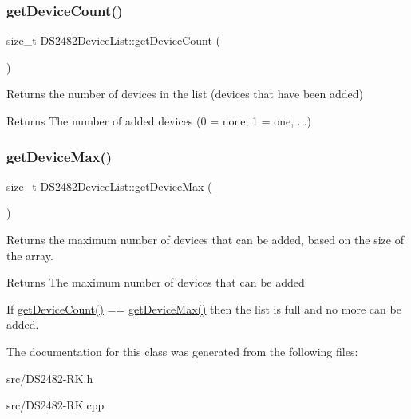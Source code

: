 \subsubsection{\texorpdfstring{get\+Device\+Count()}{getDeviceCount()}}
{\footnotesize\ttfamily size\+\_\+t D\+S2482\+Device\+List\+::get\+Device\+Count (\begin{DoxyParamCaption}{ }\end{DoxyParamCaption})\hspace{0.3cm}{\ttfamily [inline]}}



Returns the number of devices in the list (devices that have been added) 

\begin{DoxyReturn}{Returns}
The number of added devices (0 = none, 1 = one, ...) 
\end{DoxyReturn}
\mbox{\label{class_d_s2482_device_list_a20680f2eeb04a5db9f0e82d8ceff872e}} 
\subsubsection{\texorpdfstring{get\+Device\+Max()}{getDeviceMax()}}
{\footnotesize\ttfamily size\+\_\+t D\+S2482\+Device\+List\+::get\+Device\+Max (\begin{DoxyParamCaption}{ }\end{DoxyParamCaption})\hspace{0.3cm}{\ttfamily [inline]}}



Returns the maximum number of devices that can be added, based on the size of the array. 

\begin{DoxyReturn}{Returns}
The maximum number of devices that can be added
\end{DoxyReturn}
If \mbox{\hyperlink{class_d_s2482_device_list_aa7fdfbd1db3a6f22aff1135e7a566666}{get\+Device\+Count()}} == \mbox{\hyperlink{class_d_s2482_device_list_a20680f2eeb04a5db9f0e82d8ceff872e}{get\+Device\+Max()}} then the list is full and no more can be added. 

The documentation for this class was generated from the following files\+:\begin{DoxyCompactItemize}
\item 
src/D\+S2482-\/\+R\+K.\+h\item 
src/D\+S2482-\/\+R\+K.\+cpp\end{DoxyCompactItemize}
